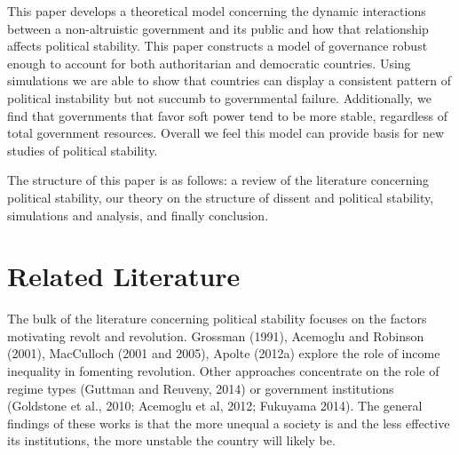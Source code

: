 \documentclass[12pt]{article}
\begin{document}
\begin{spacing}{1.5}



This paper develops a theoretical model concerning the dynamic interactions between a non-altruistic government and its public and how that relationship affects political stability. This paper constructs a model of governance robust enough to account for both authoritarian and democratic countries. Using simulations we are able to show that countries can display a consistent pattern of political instability but not succumb to governmental failure. Additionally, we find that governments that favor soft power tend to be more stable, regardless of total government resources. Overall we feel this model can provide basis for new studies of political stability.  
  
The structure of this paper is as follows: a review of the literature concerning political stability, our theory on the structure of dissent and political stability, simulations and analysis, and finally conclusion.    

\section{Related Literature}


The bulk of the literature concerning political stability focuses on the factors motivating revolt and revolution. Grossman (1991), Acemoglu and Robinson (2001), MacCulloch (2001 and 2005), Apolte (2012a) explore the role of income inequality in fomenting revolution. Other approaches concentrate on the role of regime types (Guttman and Reuveny, 2014) or government institutions (Goldstone et al., 2010; Acemoglu et al, 2012; Fukuyama 2014). The general findings of these works is that the more unequal a society is and the less effective its institutions, the more unstable the country will likely be. 


\end{spacing}
\end{document}
